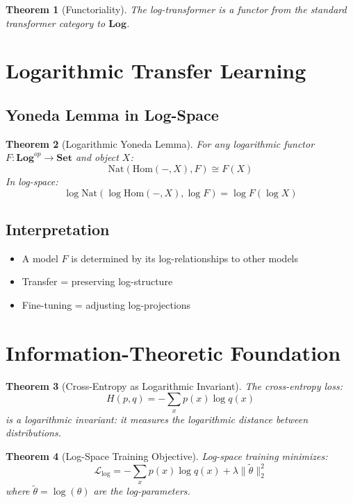 \documentclass{article}
\newtheorem{theorem}{Theorem}
\begin{document}
\begin{theorem}[Functoriality]
The log-transformer is a functor from the standard transformer category to $\mathbf{Log}$.
\end{theorem}

\section{Logarithmic Transfer Learning}

\subsection{Yoneda Lemma in Log-Space}

\begin{theorem}[Logarithmic Yoneda Lemma]
For any logarithmic functor $F: \mathbf{Log}^{op} \to \mathbf{Set}$ and object $X$:
\[
\text{Nat}(\text{Hom}(-, X), F) \cong F(X)
\]
In log-space:
\[
\log \text{Nat}(\log \text{Hom}(-, X), \log F) = \log F(\log X)
\]
\end{theorem}

\subsection{Interpretation}

\begin{itemize}
    \item A model $F$ is determined by its log-relationships to other models
    \item Transfer = preserving log-structure
    \item Fine-tuning = adjusting log-projections
\end{itemize}

\section{Information-Theoretic Foundation}

\begin{theorem}[Cross-Entropy as Logarithmic Invariant]
The cross-entropy loss:
\[
H(p, q) = -\sum_x p(x) \log q(x)
\]
is a logarithmic invariant: it measures the logarithmic distance between distributions.
\end{theorem}

\begin{theorem}[Log-Space Training Objective]
Log-space training minimizes:
\[
\mathcal{L}_{\log} = -\sum_x p(x) \log q(x) + \lambda \|\tilde{\theta}\|_2^2
\]
where $\tilde{\theta} = \log(\theta)$ are the log-parameters.
\end{theorem}
\end{document}
